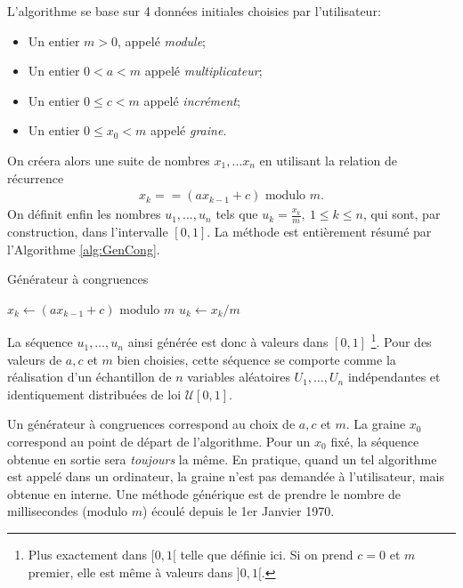 L'algorithme se base sur 4 données initiales choisies par l'utilisateur:
\begin{itemize}
\item Un entier $m > 0$, appelé \textit{module};
\item Un entier $0 < a < m$  appelé \textit{multiplicateur};
\item Un entier $0 \leq c < m$ appelé \textit{incrément};
\item Un entier $0 \leq x_0 < m$ appelé \textit{graine}.
\end{itemize}
On créera alors une suite de nombres $x_1,\dots x_n$ en utilisant la relation de récurrence
\begin{align*}
x_k = = (a x_{k-1} + c) \text{ modulo }m. 
\end{align*}
On définit enfin les nombres $u_1,\dots,u_n$ tels que $u_k = \frac{x_k}{m},~1\leq k \leq n$, qui sont, par construction, dans l'intervalle $[0, 1]$. La méthode est entièrement résumé par l'Algorithme \ref{alg:GenCong}. 
\IncMargin{1em}
\begin{algorithm}[h]
\caption{\label{alg:GenCong} Générateur à congruences}
\BlankLine
{}
{$x_k \leftarrow (a x_{k-1} + c) \text{ modulo } m$\;
$u_k \leftarrow x_k / m$\;
}
\end{algorithm}
\DecMargin{1em}

\vspace{\baselineskip}
La séquence $u_1,\dots,u_n$ ainsi générée est donc à valeurs dans $[0, 1]$ \footnote{Plus exactement dans $[0, 1[$ telle que définie ici. Si on prend $c = 0$ et $m$ premier, elle est même à valeurs dans $]0, 1[$.}. 
Pour des valeurs de $a, c$ et $m$ bien choisies, cette séquence se comporte comme la réalisation d'un échantillon de $n$ variables aléatoires $U_1,\dots, U_n$ indépendantes et identiquement distribuées de loi $\mathcal{U}[0 , 1]$.

Un générateur à congruences correspond au choix de $a, c$ et $m$.
La graine $x_0$ correspond au point de départ de l'algorithme. 
Pour un $x_0$ fixé, la séquence obtenue en sortie sera \textit{toujours} la même. 
En pratique, quand un tel algorithme est appelé dans un ordinateur, la graine n'est pas demandée à l'utilisateur, mais obtenue en interne. 
Une méthode générique est de prendre le nombre de millisecondes (modulo $m$) écoulé depuis le 1er Janvier 1970.

